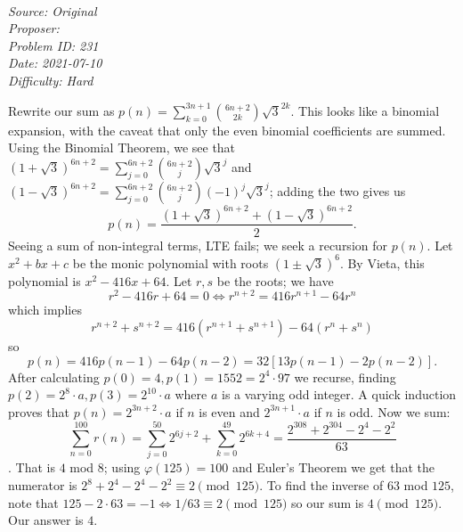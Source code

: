 \SSbreak\\
\emph{Source: Original}\\
\emph{Proposer: \Paiya}\\
\emph{Problem ID: 231}\\
\emph{Date: 2021-07-10}\\
\emph{Difficulty: Hard}\\
\SSbreak

\bigskip

\begin{solution}\hfil\medskip
  
Rewrite our sum as $p(n) = \sum_{k = 0}^{3n + 1}\binom{6n + 2}{2k}\sqrt{3}^{2k}$. This looks like a binomial expansion, with the caveat that only the even binomial coefficients are summed. Using the Binomial Theorem, we see that $\left(1 + \sqrt{3}\right)^{6n + 2} = \sum_{j = 0}^{6n + 2}\binom{6n + 2}{j}\sqrt{3}^j$ and $\left(1 - \sqrt{3}\right)^{6n + 2} = \sum_{j = 0}^{6n + 2}\binom{6n + 2}{j}(-1)^j\sqrt{3}^j$; adding the two gives us $$p(n) = \dfrac{\left(1 + \sqrt3\right)^{6n + 2} + \left(1 - \sqrt3\right)^{6n + 2}}{2}.$$ Seeing a sum of non-integral terms, LTE fails; we seek a recursion for $p(n)$. Let $x^2 + bx + c$ be the monic polynomial with roots $\left(1 \pm \sqrt3\right)^{6}$. By Vieta, this polynomial is $x^2 - 416x + 64$. Let $r, s$ be the roots; we have $$r^2 - 416r + 64 = 0 \iff r^{n + 2} = 416r^{n + 1} - 64r^n$$ which implies $$r^{n + 2} + s^{n + 2} = 416\left(r^{n + 1} + s^{n + 1}\right) - 64\left(r^n + s^n\right)$$ so $$p(n) = 416p(n - 1) - 64p(n - 2) = 32\left[13p(n - 1) - 2p(n - 2)\right].$$ After calculating $p(0) = 4, p(1) = 1552 = 2^4 \cdot 97$ we recurse, finding $p(2) = 2^8 \cdot a, p(3) = 2^{10} \cdot a$ where $a$ is a varying odd integer. A quick induction proves that $p(n) = 2^{3n + 2} \cdot a$ if $n$ is even and $2^{3n + 1} \cdot a$ if $n$ is odd. Now we sum: $$\sum_{n = 0}^{100} r(n) = \sum_{j = 0}^{50}2^{6j + 2} + \sum_{k = 0}^{49}2^{6k + 4} = \dfrac{2^{308} + 2^{304} - 2^{4} - 2^2}{63}$$. That is $4$ mod $8$; using $\varphi(125) = 100$ and Euler's Theorem we get that the numerator is $2^8 + 2^4 - 2^{4} - 2^2 \equiv 2 \pmod{125}$. To find the inverse of $63$ mod $125$, note that $125 - 2 \cdot 63 = -1 \iff 1/63 \equiv 2 \pmod{125}$ so our sum is $4 \pmod{125}$. Our answer is $\boxed{4}$.
\end{solution}\bigskip